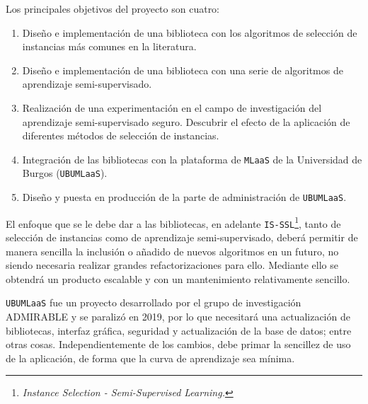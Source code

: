 Los principales objetivos del proyecto son cuatro:

\begin{enumerate}
\item Diseño e implementación de una biblioteca con los algoritmos de selección de instancias más comunes en la literatura.
\item Diseño e implementación de una biblioteca con una serie de algoritmos de aprendizaje semi-supervisado.
\item Realización de una experimentación en el campo de investigación del aprendizaje semi-supervisado seguro. Descubrir el efecto de la aplicación de diferentes métodos de selección de instancias.
\item Integración de las bibliotecas con la plataforma de \texttt{MLaaS} de la Universidad de Burgos (\texttt{UBUMLaaS}).
\item Diseño y puesta en producción de la parte de administración de \texttt{UBUMLaaS}.
\end{enumerate}


El enfoque que se le debe dar a las bibliotecas, en adelante \texttt{IS-SSL}\footnote{\textit{Instance Selection - Semi-Supervised Learning.}}, tanto de selección de instancias como de aprendizaje semi-supervisado, deberá permitir de manera sencilla la inclusión o añadido de nuevos algoritmos en un futuro, no siendo necesaria realizar grandes refactorizaciones para ello. Mediante ello se obtendrá un producto escalable y con un mantenimiento relativamente sencillo.

\texttt{UBUMLaaS} fue un proyecto desarrollado por el grupo de investigación ADMIRABLE y se paralizó en 2019, por lo que necesitará una actualización de bibliotecas, interfaz gráfica, seguridad y actualización de la base de datos; entre otras cosas. Independientemente de los cambios, debe primar la sencillez de uso de la aplicación, de forma que la curva de aprendizaje sea mínima.


